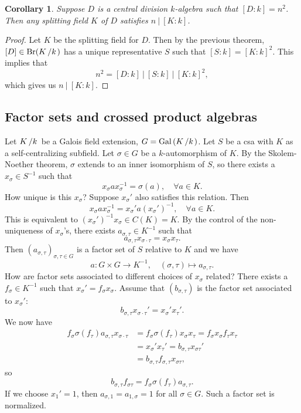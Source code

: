 \documentclass[10pt, a4paper]{article}
\newtheorem{corollary}[thm]{Corollary}
\newenvironment{noticeC}{%
  \tcolorbox[%
  notitle,
  empty,
  enhanced,  %
  breakable,
  coltext=black, 
  fontupper=\rmfamily,
  noparskip,
  sharp corners,
  boxrule=-1pt,  %
  frame hidden,
  left=7pt,  %
  right=7pt,
  top=5pt,
  bottom=5pt,
  before skip=2.5ex plus 2pt,
  after skip=2.5ex plus 2pt,
  overlay unbroken and last={%
  },
  ]}
{\endtcolorbox}
\newenvironment{myproof}%
  {\begin{noticeC}\begin{proof}}%
  {\end{proof}\end{noticeC}}
\newcommand{\quot}[2]{{\raisebox{0em}{$#1$}\left/\raisebox{0em}{$#2$}\right.}}
\newcommand{\gal}[1]{\mathrm{Gal}\, {\left(#1\right)}}
\DeclareMathOperator{\brauer}{Br}
\begin{document}
\begin{corollary}\label{cor:1}
  Suppose $D$ is a central division $k$-algebra such that $[D : k] = n^2$.
  Then any splitting field $K$ of $D$ satisfies $n \ |\ [K : k]$.
\end{corollary}

\begin{myproof}
  Let $K$ be the splitting field for $D$.
  Then by the previous theorem, $[D] \in \brauer(\quot{K}{k})$
  has a unique representative $S$ such that $[S : k] = [K : k]^2$.
  This implies that $$n^2 = [D : k]\ |\ [S : k]\ |\ [K: k]^2,$$
  which gives us $n\ |\ [K : k]$.
\end{myproof}

\subsection{Factor sets and crossed product algebras}

Let $\quot{K}{k}$ be a Galois field extension, $G = \gal{\quot{K}{k}}$.
Let $S$ be a csa with $K$ as a self-centralizing subfield.
Let $\sigma \in G$ be a $k$-automorphism of $K$.
By the Skolem-Noether theorem, $\sigma$ extends to an inner isomorphism of $S$,
so there exists a $x_{\sigma} \in S^{-1}$ such that 
$$x_{\sigma} a x_{\sigma} ^{-1} = \sigma (a), \quad \forall a \in K.$$
How unique is this $x_{\sigma}$? Suppose $x_{\sigma} '$ also satisfies this relation.
Then 
$$x_{\sigma} a x_{\sigma} ^{-1} = x_{\sigma} ' a (x_{\sigma} ') ^{-1},\quad \forall a \in K.$$
This is equivalent to $(x_{\sigma} ')^{-1} x_{\sigma} \in C(K) = K$.
By the control of the non-uniqueness of $x_{\sigma}$'s, there exists $a_{\sigma, \tau} \in K^{-1}$
such that 
$$a_{\sigma, \tau} x_{\sigma \cdot \tau} = x_{\sigma} x_{\tau}.$$
Then $(a_{\sigma, \tau})_{\sigma, \tau \in G}$ is a factor set of $S$ relative to $K$ and we have 
$$a: G \times G \to K^{-1},\quad (\sigma, \tau) \mapsto a_{\sigma, \tau}.$$
How are factor sets associated to different choices of $x_{\sigma}$ related?
There exists a $f_{\sigma} \in K^{-1}$ such that $x_{\sigma} ' = f_{\sigma} x_{\sigma}$.
Assume that $(b_{\sigma, \tau})$ is the factor set associated to $x_{\sigma} '$:
$$b_{\sigma, \tau} x_{\sigma \cdot \tau} ' = x_{\sigma} ' x_{\tau}'.$$
We now have 
\begin{align*}
  f_{\sigma} \sigma (f_{\tau}) a_{\sigma, \tau} x_{\sigma \cdot \tau} &= f_\sigma \sigma (f_\tau) x_{\sigma} x_{\tau} = f_{\sigma}x_\sigma f_\tau x_\tau\\
  &=x_\sigma ' x_\tau ' = b_{\sigma , \tau} x_{\sigma \tau} '\\
  &= b_{\sigma, \tau} f_{\sigma, \tau} x_{\sigma \tau},
\end{align*}
so $$b_{\sigma, \tau} f_{\sigma \tau} = f_{\sigma} \sigma(f_\tau) a_{\sigma, \tau}.$$
If we choose $x_1 ' = 1$, then $a_{\sigma, 1} = a_{1, \sigma} = 1$ 
for all $\sigma \in G$. Such a factor set is normalized.
\end{document}
